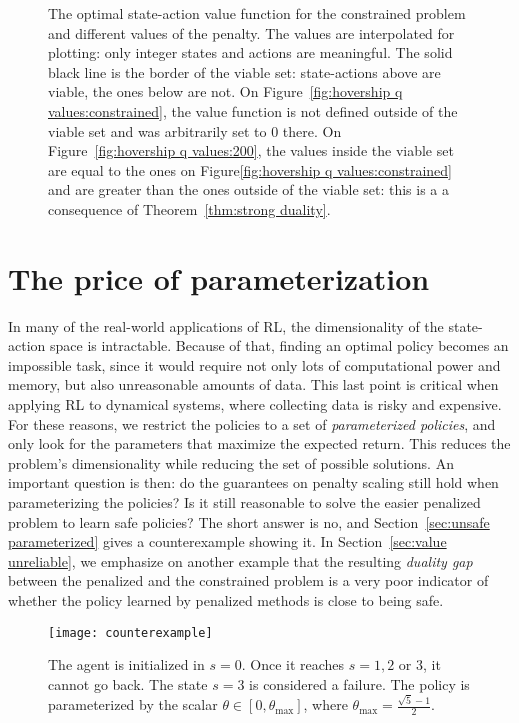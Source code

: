 \begin{figure}[!htb]
	\caption[Penalized optimal Q-value function]{The optimal state-action value function for the constrained problem and different values of the penalty. The values are interpolated for plotting: only integer states and actions are meaningful. The solid black line is the border of the viable set: state-actions above are viable, the ones below are not. On Figure~\ref{fig:hovership q values:constrained}, the value function is not defined outside of the viable set and was arbitrarily set to $0$ there. On Figure~\ref{fig:hovership q values:200}, the values inside the viable set are equal to the ones on Figure\ref{fig:hovership q values:constrained} and are greater than the ones outside of the viable set: this is a a consequence of Theorem~\ref{thm:strong duality}.}
	\label{fig:hovership q values}
\end{figure}
\section{The price of parameterization} \label{sec:parameterization}
In many of the real-world applications of RL, the dimensionality of the state-action space is intractable. Because of that, finding an optimal policy becomes an impossible task, since it would require not only lots of computational power and memory, but also unreasonable amounts of data. This last point is critical when applying RL to dynamical systems, where collecting data is risky and expensive. For these reasons, we restrict the policies to a set of\emph{ parameterized policies}, and only look for the parameters that maximize the expected return. This reduces the problem's dimensionality while reducing the set of possible solutions. An important question is then: do the guarantees on penalty scaling still hold when parameterizing the policies? Is it still reasonable to solve the easier penalized problem to learn safe policies? The short answer is no, and Section~\ref{sec:unsafe parameterized} gives a counterexample showing it. In Section~\ref{sec:value unreliable}, we emphasize on another example that the resulting\emph{ duality gap} between the penalized and the constrained problem is a very poor indicator of whether the policy learned by penalized methods is close to being safe.

\begin{figure}
	\centering
		\centering
		\texttt{[image: counterexample]}
		\caption{ The agent is initialized in $s=0$. Once it reaches $s=1, 2$ or $3$, it cannot go back. The state $s=3$ is considered a failure. The policy is parameterized by the scalar $\theta\in[0, \theta_{\text{max}}]$, where $\theta_\text{max} = \frac{\sqrt{5}-1}{2}$.}
		\label{fig:counterexample 1}
	\end{figure}

